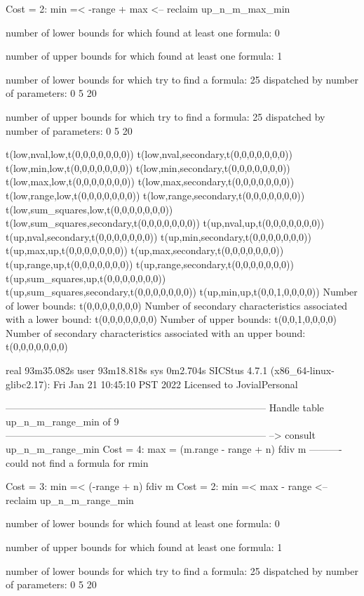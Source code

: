 Cost =  2:  min =< -range + max
<-- reclaim up_n_m_max_min

number of lower bounds for which found at least one formula: 0

number of upper bounds for which found at least one formula: 1

number of lower bounds for which try to find a formula: 25
dispatched by number of parameters: 0  5  20

number of upper bounds for which try to find a formula: 25
dispatched by number of parameters: 0  5  20

t(low,nval,low,t(0,0,0,0,0,0,0))
t(low,nval,secondary,t(0,0,0,0,0,0,0))
t(low,min,low,t(0,0,0,0,0,0,0))
t(low,min,secondary,t(0,0,0,0,0,0,0))
t(low,max,low,t(0,0,0,0,0,0,0))
t(low,max,secondary,t(0,0,0,0,0,0,0))
t(low,range,low,t(0,0,0,0,0,0,0))
t(low,range,secondary,t(0,0,0,0,0,0,0))
t(low,sum_squares,low,t(0,0,0,0,0,0,0))
t(low,sum_squares,secondary,t(0,0,0,0,0,0,0))
t(up,nval,up,t(0,0,0,0,0,0,0))
t(up,nval,secondary,t(0,0,0,0,0,0,0))
t(up,min,secondary,t(0,0,0,0,0,0,0))
t(up,max,up,t(0,0,0,0,0,0,0))
t(up,max,secondary,t(0,0,0,0,0,0,0))
t(up,range,up,t(0,0,0,0,0,0,0))
t(up,range,secondary,t(0,0,0,0,0,0,0))
t(up,sum_squares,up,t(0,0,0,0,0,0,0))
t(up,sum_squares,secondary,t(0,0,0,0,0,0,0))
t(up,min,up,t(0,0,1,0,0,0,0))
Number of lower bounds:                                             t(0,0,0,0,0,0,0)
Number of secondary characteristics associated with a lower bound:  t(0,0,0,0,0,0,0)
Number of upper bounds:                                             t(0,0,1,0,0,0,0)
Number of secondary characteristics associated with an upper bound: t(0,0,0,0,0,0,0)

real	93m35.082s
user	93m18.818s
sys	0m2.704s
SICStus 4.7.1 (x86_64-linux-glibc2.17): Fri Jan 21 10:45:10 PST 2022
Licensed to JovialPersonal


--------------------------------------------------------------------------------
Handle table up_n_m_range_min of 9
--------------------------------------------------------------------------------
--> consult up_n_m_range_min
Cost =  4:  max  = (m.range - range + n) fdiv m
----------
could not find a formula for rmin

Cost =  3:  min =< (-range + n) fdiv m
Cost =  2:  min =< max - range
<-- reclaim up_n_m_range_min

number of lower bounds for which found at least one formula: 0

number of upper bounds for which found at least one formula: 1

number of lower bounds for which try to find a formula: 25
dispatched by number of parameters: 0  5  20

